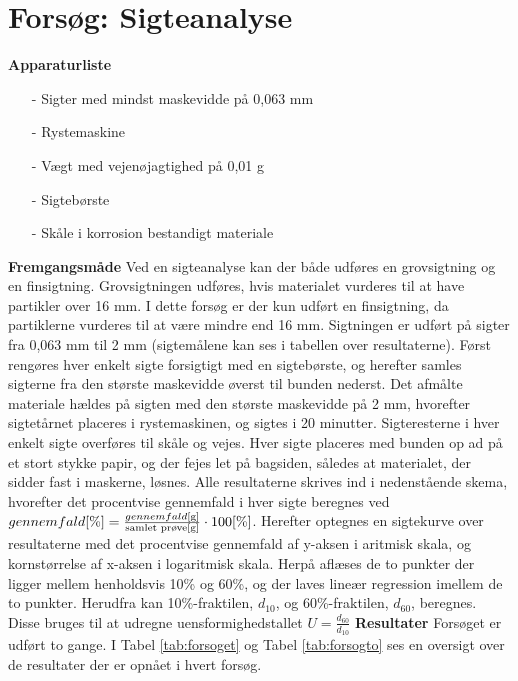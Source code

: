 \chapter{Forsøg: Sigteanalyse}

\textbf{Apparaturliste}
\begin{itemize}
	\item[-] Sigter med mindst maskevidde på 0,063 mm
	\item[-] Rystemaskine
	\item[-] Vægt med vejenøjagtighed på 0,01 g
	\item[-] Sigtebørste
	\item[-] Skåle i korrosion bestandigt materiale
\end{itemize}
\textbf{Fremgangsmåde}
\newline
Ved en sigteanalyse kan der både udføres en grovsigtning og en finsigtning. Grovsigtningen udføres, hvis materialet vurderes til at have partikler over 16 mm. I dette forsøg er der kun udført en finsigtning, da partiklerne vurderes til at være mindre end 16 mm. Sigtningen er udført på sigter fra 0,063 mm til 2 mm (sigtemålene kan ses i tabellen over resultaterne). 
\newline \indent{     }   Først rengøres hver enkelt sigte forsigtigt med en sigtebørste, og herefter samles sigterne fra den største maskevidde øverst til bunden nederst. Det afmålte materiale hældes på sigten med den største maskevidde på 2 mm, hvorefter sigtetårnet placeres i rystemaskinen, og sigtes i 20 minutter.
\newline \indent{     }   Sigteresterne i hver enkelt sigte overføres til skåle og vejes. Hver sigte placeres med bunden op ad på et stort stykke papir, og der fejes let på bagsiden, således at materialet, der sidder fast i maskerne, løsnes.
\newline \indent{     }   Alle resultaterne skrives ind i nedenstående skema, hvorefter det procentvise gennemfald i hver sigte beregnes ved $gennemfald [\%] = \frac{gennemfald [\text{g}]}{\textup{samlet prøve} [\text{g}]}\cdot 100 [\%]$. Herefter optegnes en sigtekurve over resultaterne med det procentvise gennemfald af y-aksen i aritmisk skala, og kornstørrelse af x-aksen i logaritmisk skala. Herpå aflæses de to punkter der ligger mellem henholdsvis 10\% og 60\%, og der laves lineær regression imellem de to punkter. Herudfra kan 10\%-fraktilen, $d_{10}$, og 60\%-fraktilen, $d_{60}$, beregnes. Disse bruges til at udregne uensformighedstallet $U = \frac{d_{60}}{d_{10}}$
\newline
\newline
\textbf{Resultater}
\newline
Forsøget er udført to gange. I Tabel \ref{tab:forsoget} og Tabel \ref{tab:forsogto} ses en oversigt over de resultater der er opnået i hvert forsøg. 

